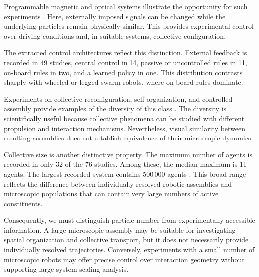 Programmable magnetic and optical systems illustrate
the opportunity for such experiments
\cite{Chen2020temporallightmodul,Chen2022programmablespatio,Xu2022collectivebehaviors,Liu2023swarmingmultifuncti,Chen2023nanorobotmediateds,Ussia2024magneticmicrorobot,Tran2025roboticmicrocapsule,Xia2025artificialintellige,Wang2026reconfigurableassem,Kim2026magneticmxenebased}.
Here, externally imposed signals can be changed while
the underlying particles remain physically similar.
This provides experimental control over driving
conditions and, in suitable systems, collective
configuration.

The extracted control architectures reflect this
distinction. External feedback is recorded in
49 studies, central control in 14, passive or
uncontrolled rules in 11, on-board rules in two,
and a learned policy in one. This distribution
contrasts sharply with wheeled or legged swarm
robots, where on-board rules dominate.

Experiments on collective reconfiguration,
self-organization, and controlled assembly
provide examples of the diversity of this class
\cite{Aubret2021metamachinesofplur,Gardi2022microrobotcollectiv,Yang2022emergentmicroroboti,Urso2023reconfigurableself,Goyal2025externallycontrolle,Gao2025softmagneticmicror,Alapan2019shapeencodeddynami,Aubret2018targetedassemblyan,Raghavendra2026programmablepersist,Ahmed2021bioinspiredacousto,Yan2024programmingstructur,Yigit2020cohesiveselforgani,Desgranges2023microswimmersunder}.
The diversity is scientifically useful because
collective phenomena can be studied with different
propulsion and interaction mechanisms. Nevertheless,
visual similarity between resulting assemblies
does not establish equivalence of their microscopic
dynamics.

Collective size is another distinctive property.
The maximum number of agents is recorded in only
32 of the 76 studies. Among these, the median
maximum is 11 agents. The largest recorded system
contains 500\,000 agents
\cite{Xie2020bioinspiredsoftmic}.
This broad range reflects the difference between
individually resolved robotic assemblies and
microscopic populations that can contain very
large numbers of active constituents.

Consequently, we must distinguish particle
number from experimentally accessible information.
A large microscopic assembly may be suitable
for investigating spatial organization and
collective transport, but it does not necessarily
provide individually resolved trajectories.
Conversely, experiments with a small number
of microscopic robots may offer precise control
over interaction geometry without supporting
large-system scaling analysis.

